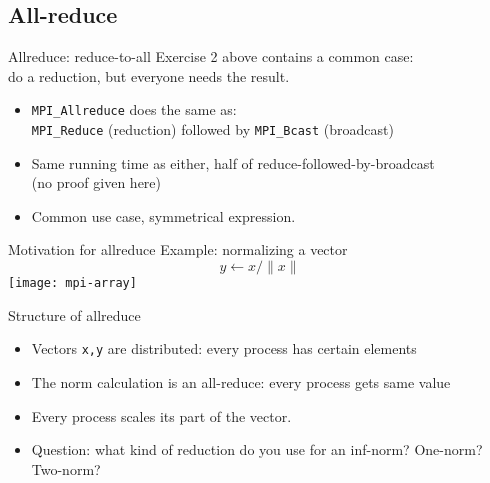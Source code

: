 
\begin{exerciseframe}
  
\end{exerciseframe}

\subsection{All-reduce}

\begin{numberedframe}{Allreduce: reduce-to-all}
  Exercise 2 above contains a common case:\\
  do a reduction, but everyone needs the result.
  \begin{itemize}
  \item \lstinline{MPI_Allreduce} does the same as:\\
    \lstinline{MPI_Reduce} (reduction) followed by \lstinline{MPI_Bcast} (broadcast)
  \item Same running time as either, half of reduce-followed-by-broadcast\\
    (no proof given here)
  \item Common use case, symmetrical expression.
  \end{itemize}
\end{numberedframe}

\begin{numberedframe}{Motivation for allreduce}
  Example: normalizing a vector
  \[ y \leftarrow x/\|x\| \]
  \texttt{[image: mpi-array]}
\end{numberedframe}

\begin{numberedframe}{Structure of allreduce}
  \begin{itemize}
  \item Vectors \lstinline{x,y} are distributed: every process has certain
    elements
  \item The norm calculation is an all-reduce: every process gets same
    value
  \item Every process scales its part of the vector.
  \item Question: what kind of reduction do you use for an inf-norm? One-norm? Two-norm?
  \end{itemize}
\end{numberedframe}


